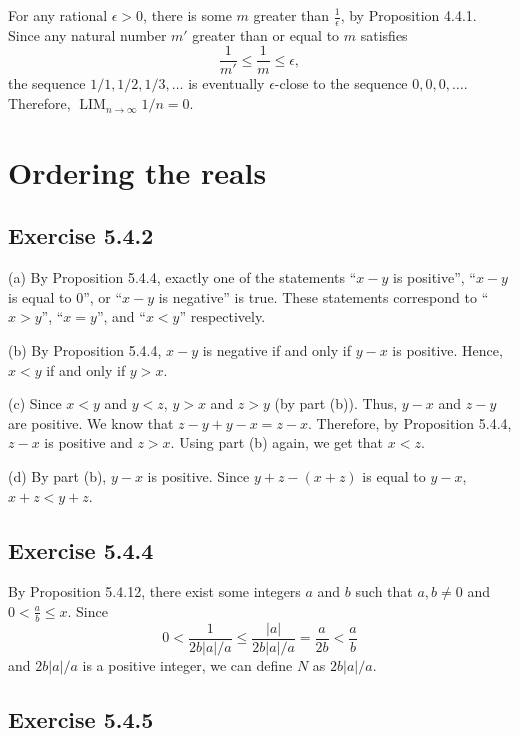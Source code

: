 \documentclass[12pt, oneside]{book}
\DeclareMathOperator*{\formallim}{LIM}
\begin{document}
	For any rational $\epsilon > 0$, there is some $m$ greater than $\frac{1}{\epsilon}$, by Proposition 4.4.1. Since any natural number $m'$ greater than or equal to $m$ satisfies
	\[\frac{1}{m'} \le \frac{1}{m} \le \epsilon,\]
	the sequence $1/1, 1/2, 1/3, \dotsc$ is eventually $\epsilon$-close to the sequence $0, 0, 0, \dotsc$. Therefore, $\formallim_{n \to \infty} 1/n = 0$.

	\section{Ordering the reals}

	\subsection*{Exercise 5.4.2}

	\noindent (a) By Proposition 5.4.4, exactly one of the statements ``$x - y$ is positive'', ``$x - y$ is equal to $0$'', or ``$x - y$ is negative'' is true. These statements correspond to ``$x > y$'', ``$x = y$'', and ``$x < y$'' respectively.

	\bigskip
	\noindent (b) By Proposition 5.4.4, $x - y$ is negative if and only if $y - x$ is positive. Hence, $x < y$ if and only if $y > x$.

	\bigskip
	\noindent (c) Since $x < y$ and $y < z$, $y > x$ and $z > y$ (by part (b)). Thus, $y - x$ and $z - y$ are positive. We know that $z - y + y - x = z - x$. Therefore, by Proposition 5.4.4, $z - x$ is positive and $z > x$. Using part (b) again, we get that $x < z$.

	\bigskip
	\noindent (d) By part (b), $y - x$ is positive. Since $y + z - (x + z)$ is equal to $y - x$, $x + z < y + z$.

	\subsection*{Exercise 5.4.4}

	By Proposition 5.4.12, there exist some integers $a$ and $b$ such that $a, b \ne 0$ and $0 < \frac{a}{b} \le x$. Since
	\[0 < \frac{1}{2b|a| / a} \le \frac{|a|}{2b|a| / a} = \frac{a}{2b} < \frac{a}{b}\]
	 and $2b|a| / a$ is a positive integer, we can define $N$ as $2b|a| / a$.

	\subsection*{Exercise 5.4.5}
\end{document}
